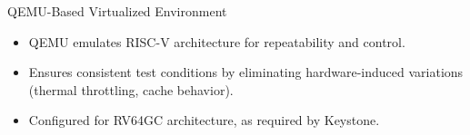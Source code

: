 \documentclass[aspectratio=169]{beamer}
\begin{document}
\begin{frame}{QEMU-Based Virtualized Environment}
    \small
    \begin{itemize}
        \item QEMU emulates RISC-V architecture for repeatability and control. \pause
        \item Ensures consistent test conditions by eliminating hardware-induced variations (thermal throttling, cache behavior). \pause
        \item Configured for RV64GC architecture, as required by Keystone. \pause
    \end{itemize}
    \vspace{0.5em}
\end{frame}
\end{document}
